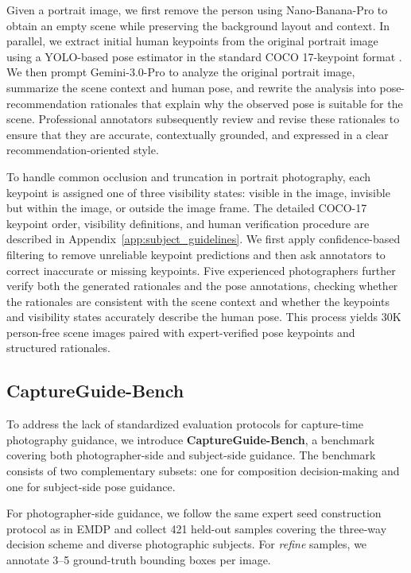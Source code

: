 \documentclass{article} %
\begin{document}
Given a portrait image, we first remove the person using Nano-Banana-Pro \cite{google_nanobananapro} to obtain an empty scene while preserving the background layout and context.
In parallel, we extract initial human keypoints from the original portrait image using a YOLO-based pose estimator \citep{jocher2026ultralyticsyolo26unifiedrealtime} in the standard COCO 17-keypoint format \cite{lin2014microsoft}.
We then prompt Gemini-3.0-Pro to analyze the original portrait image, summarize the scene context and human pose, and rewrite the analysis into pose-recommendation rationales that explain why the observed pose is suitable for the scene. Professional annotators subsequently review and revise these rationales to ensure that they are accurate, contextually grounded, and expressed in a clear recommendation-oriented style.

To handle common occlusion and truncation in portrait photography, each keypoint is assigned one of three visibility states: visible in the image, invisible but within the image, or outside the image frame. The detailed COCO-17 keypoint order, visibility definitions, and human verification procedure are described in Appendix~\ref{app:subject_guidelines}. We first apply confidence-based filtering to remove unreliable keypoint predictions and then ask annotators to correct inaccurate or missing keypoints. Five experienced photographers further verify both the generated rationales and the pose annotations, checking whether the rationales are consistent with the scene context and whether the keypoints and visibility states accurately describe the human pose. This process yields 30K person-free scene images paired with expert-verified pose keypoints and structured rationales.

\subsection{CaptureGuide-Bench}
\label{captureguide-bench}
To address the lack of standardized evaluation protocols for capture-time photography guidance, we introduce \textbf{CaptureGuide-Bench}, a benchmark covering both photographer-side and subject-side guidance. The benchmark consists of two complementary subsets: one for composition decision-making and one for subject-side pose guidance.

For photographer-side guidance, we follow the same expert seed construction protocol as in EMDP
and collect 421 held-out samples covering the three-way decision scheme and diverse photographic subjects. For \textit{refine} samples, we annotate 3--5 ground-truth bounding boxes per image.
\end{document}
